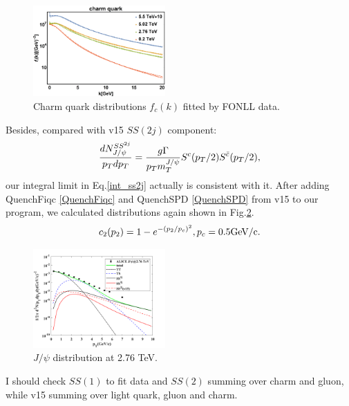 \documentclass[twocolumn,aps,superscriptaddress,nofootinbib,floatfix]{revtex4}
\begin{document}
\begin{figure}[H]
	\includegraphics[width=0.45\textwidth]{FONLL_2.png}
	\caption{Charm quark distributions $f_c(k)$ fitted by FONLL data. }
	\label{fig34}
\end{figure}

Besides, compared with v15 $SS(2j)$ component:
 \begin{eqnarray}
	{dN_{J/\psi}^{SS^{2j}} \over p_Tdp_T}={g\Gamma \over p_Tm_T^{J/\psi}}S^c(p_T/2)S^{\bar{c}}(p_T/2),
\end{eqnarray}
our integral limit in Eq.\ref{int_ss2j} actually is consistent with it. After adding QuenchFiqc \ref{QuenchFiqc} and QuenchSPD \ref{QuenchSPD}
 from v15 to our program, we calculated distributions again shown in Fig.\ref{fig35}.
 \begin{eqnarray}
 	c_2(p_2)=1-e^{-(p_2/p_c)^2},\space p_c=0.5 \text{GeV/c}.\label{QuenchSPD}
 \end{eqnarray}
\begin{figure}[H]
	\includegraphics[width=0.45\textwidth]{Jpsi276_compare.png}
	\caption{$J/\psi$ distribution at 2.76 TeV. }
	\label{fig35}
\end{figure}

I should check $SS(1)$ to fit data and $SS(2)$ summing over charm and gluon, while v15 summing over light quark, gluon and charm.
\end{document}

